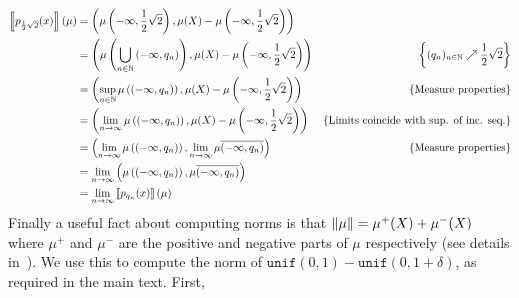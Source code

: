 \documentclass[a4paper,UKenglish,cleveref, autoref, thm-restate]{lipics-v2021}
\begin{document}
        \begin{align*}
                \left \llbracket p_{\frac{1}{2} \sqrt{2}}(x) \right \rrbracket(\mu)
                & = \left (\mu \left (-\infty, \frac{1}{2} \sqrt{2} \right ), 
                \mu(X) - \mu \left (-\infty, \frac{1}{2}\sqrt{2} \right ) \right )
                &
                \\
                & = \left (\mu \left (\bigcup_{n \in \mathbb{N}} 
                        \left (-\infty, q_n \right )\right ), 
                \mu(X) - \mu \left (-\infty, \frac{1}{2}\sqrt{2} \right ) \right )
                & 
                \left \{(q_n)_{n \in \mathbb{N}} 
                \nearrow \frac{1}{2}\sqrt{2} \right \}
                \\
                & = \left (\sup_{n \in \mathbb{N}} \mu \left ( 
                        \left (-\infty, q_n \right )\right ), 
                \mu(X) - \mu \left (-\infty, \frac{1}{2}\sqrt{2} \right ) \right )
                & 
                \left \{ \text{Measure properties} \right \}
                \\
                & = \left (\lim_{n \to \infty} \mu \left ( 
                        \left (-\infty,  q_n \right )\right ), 
                \mu(X) - \mu \left (-\infty, \frac{1}{2}\sqrt{2} \right ) \right )
                & 
                \left \{ \text{Limits coincide with sup. of inc. seq.} \right \}                         \\
                & = \left (\lim_{n \to \infty} \mu \left ( 
                        \left (-\infty, q_n \right )\right ), 
                \lim_{n \to \infty}
                \mu \overline{\left (-\infty, q_n \right )} \right )
                & 
                \left \{ \text{Measure properties} \right \}
                \\
                & = \lim_{n \to \infty} \left (\mu \left ( 
                        \left (-\infty,  q_n \right )\right ), 
                \mu \overline{\left (-\infty, q_n \right )} \right )
                & 
                \\
                & = \lim_{n \to \infty}
                \left \llbracket p_{q_n}(x) \right \rrbracket(\mu)
                &
        \end{align*}
Finally a useful fact about computing norms is that $\left\lVert \mu \right\rVert = \mu^{+}(X) +
\mu^{-}(X)$ where $\mu^{+}$ and $\mu^{-}$ are the positive and negative parts
of $\mu$ respectively (see details in~\cite[Section 8.2. and Section
10.10]{aliprantis06}). We use this to compute the norm of $\mathtt{unif}(0,1) -
\mathtt{unif}(0,1+\delta)$, as required in the main text. First,
\end{document}
